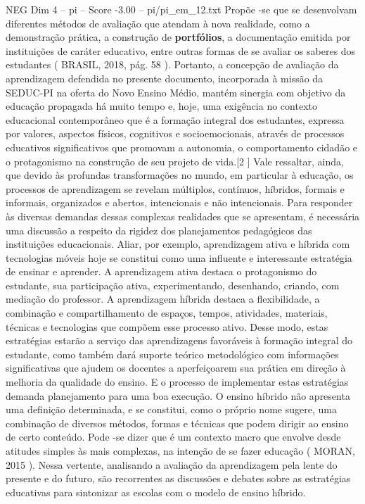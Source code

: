 \begin{textsample}{NEG Dim 4 – pi – Score -3.00 – pi/pi\_em\_12.txt}
Propõe -se que se desenvolvam diferentes métodos de avaliação que atendam à nova realidade, como a demonstração prática, a construção de \textbf{portfólios}, a documentação emitida por instituições de caráter educativo, entre outras formas de se avaliar os saberes dos estudantes ( BRASIL, 2018, pág. 58 ).
Portanto, a concepção de avaliação da aprendizagem defendida no presente documento, incorporada à missão da SEDUC-PI na oferta do Novo Ensino Médio, mantém sinergia com objetivo da educação propagada há muito tempo e, hoje, uma exigência no contexto educacional contemporâneo que é a formação integral dos estudantes, expressa por valores, aspectos físicos, cognitivos e socioemocionais, através de processos educativos significativos que promovam a autonomia, o comportamento cidadão e o protagonismo na construção de seu projeto de vida.[2 ] Vale ressaltar, ainda, que devido às profundas transformações no mundo, em particular à educação, os processos de aprendizagem se revelam múltiplos, contínuos, híbridos, formais e informais, organizados e abertos, intencionais e não intencionais.
Para responder às diversas demandas dessas complexas realidades que se apresentam, é necessária uma discussão a respeito da rigidez dos planejamentos pedagógicos das instituições educacionais.
Aliar, por exemplo, aprendizagem ativa e híbrida com tecnologias móveis hoje se constitui como uma influente e interessante estratégia de ensinar e aprender.
A aprendizagem ativa destaca o protagonismo do estudante, sua participação ativa, experimentando, desenhando, criando, com mediação do professor.
A aprendizagem híbrida destaca a flexibilidade, a combinação e compartilhamento de espaços, tempos, atividades, materiais, técnicas e tecnologias que compõem esse processo ativo.
Desse modo, estas estratégias estarão a serviço das aprendizagens favoráveis à formação integral do estudante, como também dará suporte teórico metodológico com informações significativas que ajudem os docentes a aperfeiçoarem sua prática em direção à melhoria da qualidade do ensino.
E o processo de implementar estas estratégias demanda planejamento para uma boa execução.
O ensino híbrido não apresenta uma definição determinada, e se constitui, como o próprio nome sugere, uma combinação de diversos métodos, formas e técnicas que podem dirigir ao ensino de certo conteúdo.
Pode -se dizer que é um contexto macro que envolve desde atitudes simples às mais complexas, na intenção de se fazer educação ( MORAN, 2015 ).
Nessa vertente, analisando a avaliação da aprendizagem pela lente do presente e do futuro, são recorrentes as discussões e debates sobre as estratégias educativas para sintonizar as escolas com o modelo de ensino híbrido.

\end{textsample}
